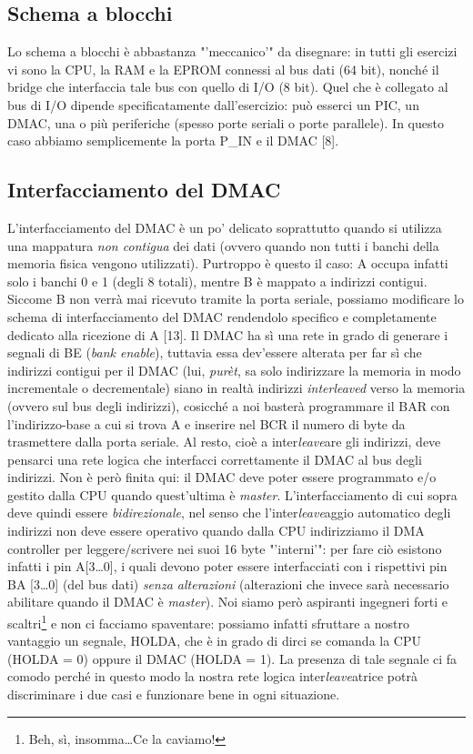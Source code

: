 \subsection{Schema a blocchi}
\label{sec:schemaBlocchiMadre}

Lo schema a blocchi è abbastanza "'meccanico'" da disegnare: in tutti gli esercizi vi sono la CPU, la RAM e la EPROM connessi al bus dati (64 bit), nonché il bridge che interfaccia tale bus con quello di I/O (8 bit). Quel che è collegato al bus di I/O dipende specificatamente dall'esercizio: può esserci un PIC, un DMAC, una o più periferiche (spesso porte seriali o porte parallele). In questo caso abbiamo semplicemente la porta P\_IN e il DMAC [8].

\subsection{Interfacciamento del DMAC}
\label{sec:DMACmadre}

L'interfacciamento del DMAC è un po' delicato soprattutto quando si utilizza una mappatura \textit{non contigua} dei dati (ovvero quando non tutti i banchi della memoria fisica vengono utilizzati). Purtroppo è questo il caso: A occupa infatti solo i banchi 0 e 1 (degli 8 totali), mentre B è mappato a indirizzi contigui.
Siccome B non verrà mai ricevuto tramite la porta seriale, possiamo modificare lo schema di interfacciamento del DMAC rendendolo specifico e completamente dedicato alla ricezione di A [13]. Il DMAC ha sì una rete in grado di generare i segnali di BE (\textit{bank enable}), tuttavia essa dev'essere alterata per far sì che indirizzi contigui per il DMAC (lui, \textit{purèt}, sa solo indirizzare la memoria in modo incrementale o decrementale) siano in realtà indirizzi \textit{interleaved} verso la memoria (ovvero sul bus degli indirizzi), cosicché a noi basterà programmare il BAR con l'indirizzo-base a cui si trova A e inserire nel BCR il numero di byte da trasmettere dalla porta seriale. Al resto, cioè a inter\textit{leave}are gli indirizzi, deve pensarci una rete logica che interfacci correttamente il DMAC al bus degli indirizzi. 
Non è però finita qui: il DMAC deve poter essere programmato e/o gestito dalla CPU quando quest'ultima è \textit{master}. L'interfacciamento di cui sopra deve quindi essere \textit{bidirezionale}, nel senso che l'inter\textit{leave}aggio automatico degli indirizzi non deve essere operativo quando dalla CPU indirizziamo il DMA controller per leggere/scrivere nei suoi 16 byte "'interni'": per fare ciò esistono infatti i pin A[3\ldots 0], i quali devono poter essere interfacciati con i rispettivi pin BA [3\ldots 0] (del bus dati) \textit{senza alterazioni} (alterazioni che invece sarà necessario abilitare quando il DMAC è \textit{master}).
Noi siamo però aspiranti ingegneri forti e scaltri\footnote{Beh, sì, insomma\ldots Ce la caviamo!} e non ci facciamo spaventare: possiamo infatti sfruttare a nostro vantaggio un segnale, HOLDA, che è in grado di dirci se comanda la CPU (HOLDA = 0) oppure il DMAC (HOLDA = 1). La presenza di tale segnale ci fa comodo perché in questo modo la nostra rete logica inter\textit{leave}atrice potrà discriminare i due casi e funzionare bene in ogni situazione. \\

